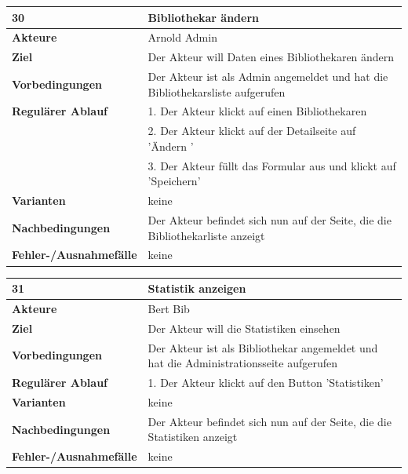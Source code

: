 \documentclass[fontsize=12pt,paper=a4,twoside]{scrartcl}
\begin{document}
\begin{table}[htbp]
\label{30}
\begin{tabular}{|l|p{10cm}|}
\hline 
\textbf{30} & \textbf{Bibliothekar ändern} \\ \hline
\textbf{Akteure} & Arnold Admin\\ \hline
\textbf{Ziel} & Der Akteur will Daten eines Bibliothekaren ändern \\ \hline
\textbf{Vorbedingungen} & Der Akteur ist als Admin angemeldet und hat die Bibliothekarsliste 
aufgerufen \\ \hline
\textbf{Regulärer Ablauf} & 
1. Der Akteur klickt auf einen Bibliothekaren \\
&2. Der Akteur klickt auf der Detailseite auf 'Ändern '\\
&3. Der Akteur füllt das Formular aus und klickt auf 'Speichern'\\
\hline
\textbf{Varianten} & 
keine \\ \hline
\textbf{Nachbedingungen} & Der Akteur befindet sich nun auf der Seite, die die Bibliothekarliste 
anzeigt\\ \hline
\textbf{Fehler-/Ausnahmefälle} & keine\\
\hline
\end{tabular}
\end{table}


\begin{table}[htbp]
\label{31}
\begin{tabular}{|l|p{10cm}|}
\hline 
\textbf{31} & \textbf{Statistik anzeigen} \\ \hline
\textbf{Akteure} & Bert Bib\\ \hline
\textbf{Ziel} & Der Akteur will die Statistiken einsehen \\ \hline
\textbf{Vorbedingungen} & Der Akteur ist als Bibliothekar angemeldet und hat die Administrationsseite 
aufgerufen \\ \hline
\textbf{Regulärer Ablauf} & 
1. Der Akteur klickt auf den Button 'Statistiken' \\
\hline
\textbf{Varianten} & 
keine \\ \hline
\textbf{Nachbedingungen} & Der Akteur befindet sich nun auf der Seite, die die Statistiken anzeigt\\
\hline
\textbf{Fehler-/Ausnahmefälle} & keine\\
\hline
\end{tabular}
\end{table}
\end{document}
